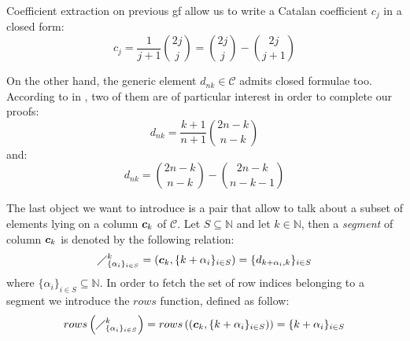 \iffalse
Go back to identity:
\begin{displaymath}
    d_{nk} = \sum_{i_{1}+ i_{2}+ \ldots+ i_{k+1}=n+1}{
            c_{i_{1}-1}\,c_{i_{2}-1}\,\ldots\,c_{i_{k+1}-1} }
\end{displaymath}
\fi

Coefficient extraction on previous \ac{gf} allow us to write 
a Catalan coefficient $c_{j}$ in a closed form:
\begin{equation}
    c_{j} = \frac{1}{j+1}{{2j}\choose{j}} 
        = {{2j}\choose{j}} - {{2j}\choose{j+1}}
    \label{eq:catalan:coeff:rewriting}
\end{equation}

 On the other hand, the generic element
$d_{nk}\in\mathcal{C}$ admits closed formulae too. According to
\citeauthor{luzon:2012631} in \cite{luzon:2012631}, two of them are of
particular interest in order to complete our proofs:
\begin{equation}
    d_{nk}=\frac{k+1}{n+1}{{2n-k}\choose{n-k}}
    \label{eq:catalan:array:first:identity}
\end{equation}
and:
\begin{equation}
    d_{nk}={{2n-k}\choose{n-k}} - {{2n-k}\choose{n-k-1}}
    \label{eq:catalan:array:second:identity}
\end{equation}


The
last object we want to
introduce is a pair that allow to talk about a subset of elements lying on a
column $\boldsymbol{c}_{k}$ of $\mathcal{C}$. Let $S\subseteq\mathbb{N}$  
and let $k\in\mathbb{N}$, then a \emph{segment} of column $\boldsymbol{c}_{k}$ is
denoted by the following relation:
\begin{equation}
    \diagup_{\lbrace\alpha_{i}\rbrace_{i\in S}}^{k}
        = \left(\boldsymbol{c}_{k},\lbrace k+\alpha_{i}\rbrace_{i\in S}\right)
        = \lbrace d_{k+\alpha_{i},k}\rbrace_{i\in S}
    \label{eq:column:segment}
\end{equation}
where $\lbrace\alpha_{i}\rbrace_{i\in S}\subseteq\mathbb{N}$. 
In order to fetch the set of 
row indices belonging to a segment we introduce the $rows$ function, defined as follow:
\begin{displaymath}
    rows\left(\diagup_{\lbrace\alpha_{i}\rbrace_{i\in S}}^{k}\right)
        = rows\left(\left(\boldsymbol{c}_{k},\lbrace k+\alpha_{i}\rbrace_{i\in S}\right)\right)
        = \lbrace k+\alpha_{i}\rbrace_{i\in S}
    \label{eq:column:segment:rows:function}
\end{displaymath}

